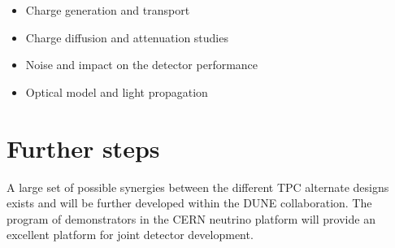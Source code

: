 \begin{itemize}

 \item Charge generation and transport 

\item Charge diffusion and attenuation	
  studies	
  
\item Noise and impact on the detector	performance	
  
\item Optical  model	 and light  propagation	
 
\end{itemize}

\section{Further steps
}

A large set of possible synergies between the different TPC alternate designs exists and will be further developed within the DUNE collaboration.  The program of demonstrators in the CERN neutrino platform will provide an excellent platform for joint detector development. 


